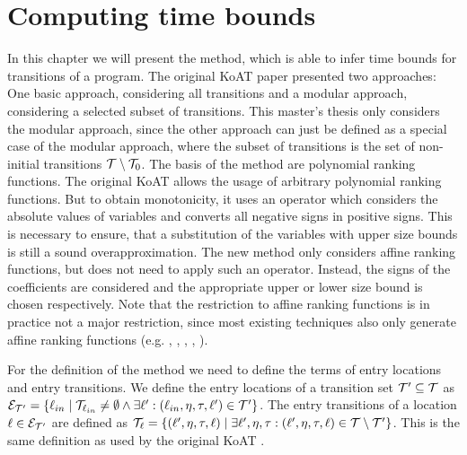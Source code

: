 \section{Computing time bounds}

In this chapter we will present the method, which is able to infer time bounds for transitions of a program.
The original KoAT paper \cite{koat} presented two approaches: One basic approach, considering all transitions and a modular approach, considering a selected subset of transitions.
This master's thesis only considers the modular approach, since the other approach can just be defined as a special case of the modular approach, where the subset of transitions is the set of non-initial transitions $\mathcal{T} \setminus \mathcal{T}_0$.
The basis of the method are polynomial ranking functions.
The original KoAT allows the usage of arbitrary polynomial ranking functions.
But to obtain monotonicity, it uses an operator which considers the absolute values of variables and converts all negative signs in positive signs.
This is necessary to ensure, that a substitution of the variables with upper size bounds is still a sound overapproximation.
The new method only considers affine ranking functions, but does not need to apply such an operator.
Instead, the signs of the coefficients are considered and the appropriate upper or lower size bound is chosen respectively.
Note that the restriction to affine ranking functions is in practice not a major restriction, since most existing techniques also only generate affine ranking functions (e.g. \cite{podelski2004prf}, \cite{bradley2005linear}, \cite{bagnara2012new}, \cite{leike2014ranking}, \cite{ben2013linear}).

For the definition of the method we need to define the terms of entry locations and entry transitions.
We define the entry locations of a transition set $\mathcal{T}' \subseteq \mathcal{T}$ as $\mathcal{E}_{\mathcal{T}'} = \lbrace \ell_{in} \mid \mathcal{T}_{\ell_{in}} \neq \emptyset \wedge \exists \ell': (\ell_{in}, \eta, \tau, \ell') \in \mathcal{T}' \rbrace$.
The entry transitions of a location $\ell \in \mathcal{E}_{\mathcal{T}'}$ are defined as $\mathcal{T}_{\ell} = \lbrace (\ell', \eta, \tau, \ell) \mid \exists \ell', \eta, \tau: (\ell', \eta, \tau, \ell) \in \mathcal{T} \setminus \mathcal{T}' \rbrace$.
This is the same definition as used by the original KoAT \cite{koat}.




